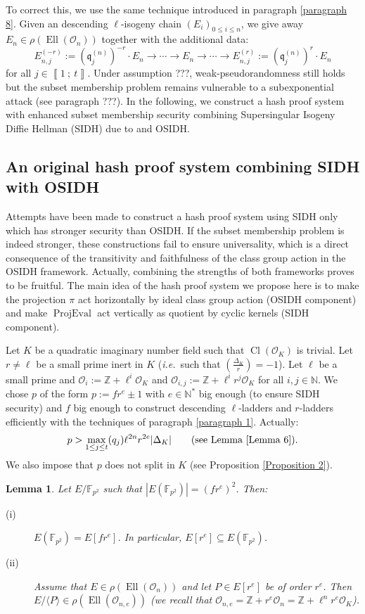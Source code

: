 \documentclass[a4paper,10pt]{report}
\theoremstyle{definition}
\theoremstyle{plain}
\newtheorem{Lemma}[Definition]{Lemma}
\theoremstyle{definition}
\newcommand{\ie}{\emph{i.e.}\ }
\newcommand{\N}{\mathbb{N}}
\newcommand{\Z}{\mathbb{Z}}
\newcommand{\F}{\mathbb{F}}
\newcommand{\mO}{\mathcal{O}}
\renewcommand{\i}[2]{\left\llbracket #1~;~#2\right\rrbracket}
\renewcommand{\(}{\left(}
\renewcommand{\)}{\right)}
\newcommand{\mf}[1]{\mathfrak{#1}}
\DeclareMathOperator{\Cl}{Cl}
\DeclareMathOperator{\Ell}{Ell}
\DeclareMathOperator{\ProjEval}{ProjEval}
\begin{document}
To correct this, we use the same technique introduced in paragraph \ref{paragraph 8}. Given an descending $\ell$-isogeny chain $(E_i)_{0\leq i\leq n}$, we give away $E_n\in\rho(\Ell(\mO_n))$ together with the additional data:
\[E_{n,j}^{(-r)}:=(\mf{q}_j^{(n)})^{-r}\cdot E_n\longrightarrow \cdots \longrightarrow E_{n}\longrightarrow \cdots\longrightarrow E_{n,j}^{(r)}:=(\mf{q}_j^{(n)})^{r}\cdot E_n\]
for all $j\in\i{1}{t}$. Under assumption ???, weak-pseudorandomness still holds but the subset membership problem remains vulnerable to a subexponential attack (see paragraph ???). In the following, we construct a hash proof system with enhanced subset membership security combining Supersingular Isogeny Diffie Hellman (SIDH) due to \cite{DeFeoSIDH} and OSIDH.

\subsection{An original hash proof system combining SIDH with OSIDH}

Attempts have been made to construct a hash proof system using SIDH only which has stronger security than OSIDH. If the subset membership problem is indeed stronger, these constructions fail to ensure universality, which is a direct consequence of the transitivity and faithfulness of the class group action in the OSIDH framework.  Actually, combining the strengths of both frameworks proves to be fruitful.  The main idea of the hash proof system we propose here is to make the projection $\pi$ act horizontally by ideal class group action (OSIDH component) and make $\ProjEval$ act vertically as quotient by cyclic kernels (SIDH component).   

Let $K$ be a quadratic imaginary number field such that $\Cl(\mO_K)$ is trivial.  Let $r\neq \ell$ be a small prime inert in $K$ (\ie such that $\(\frac{\Delta_K}{r}\)=-1$). Let $\ell$ be a small prime and $\mO_i:=\Z+\ell^i\mO_K$ and $\mO_{i,j}:=\Z+\ell^ir^j\mO_K$ for all $i, j\in\N$. We chose $p$ of the form $p:=f r^e\pm 1$ with $e\in\N^*$ big enough (to ensure SIDH security) and $f$ big enough to construct descending $\ell$-ladders and $r$-ladders efficiently with the techniques of paragraph \ref{paragraph 1}. Actually:
\[p>\max_{1\leq j\leq t}(q_j)\ell^{2n}r^{2e}|\Delta_K|\qquad (\mbox{see Lemma \ref{Lemma 6}}).\]
We also impose that $p$ does not split in $K$ (see Proposition \ref{Proposition 2}). 

\begin{Lemma}\label{Lemma 7}
Let $E/\F_{p^2}$ such that $|E(\F_{p^2})|=(f r^e)^2$. Then:
\begin{description}
\item[(i)] $E(\F_{p^2})=E[fr^e]$. In particular, $E[r^e]\subseteq E(\F_{p^2})$.
\item[(ii)] Assume that $E\in\rho(\Ell(\mO_n))$ and let $P\in E[r^e]$ be of order $r^e$. Then $E/\langle P\rangle\in \rho(\Ell(\mO_{n,e}))$ (we recall that $\mO_{n,e}=\Z+r^e\mO_n=\Z+\ell^n r^e\mO_K$).
\end{description}
\end{Lemma}
\end{document}
